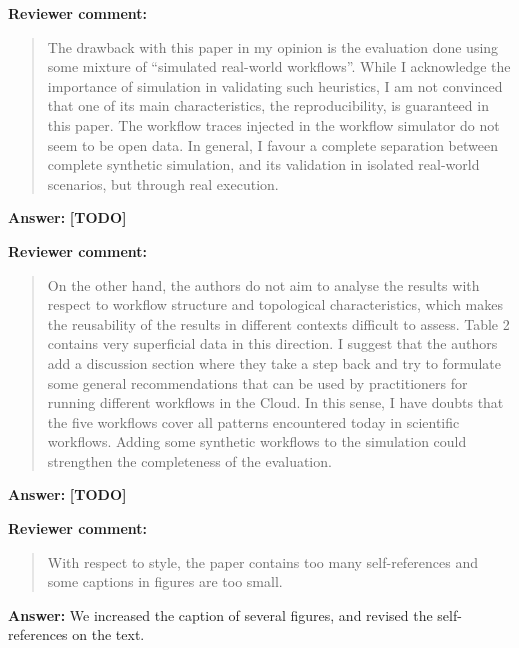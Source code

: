 \documentclass{letter}
\newenvironment{review}%
{\textbf{Reviewer comment:}\begin{quote}}%
{\end{quote}}%
\newcommand{\todo}[1]{%
      \color{red}\textbf{[TODO]} #1\color{black}}
\newcommand{\answer}[1]{%
      \textbf{Answer:} #1}
\begin{document}
\begin{letter}{}
\begin{review}
The drawback with this paper in my opinion is the evaluation done using some mixture of ``simulated real-world workflows''. While I acknowledge the importance of simulation in validating such heuristics, I am not convinced that one of its main characteristics, the reproducibility, is guaranteed in this paper. The workflow traces injected in the workflow simulator do not seem to be open data. In general, I favour a complete separation between complete synthetic simulation, and its validation in isolated real-world scenarios, but through real execution. 
\end{review}

\answer{\todo{}}



\begin{review}
On the other hand, the authors do not aim to analyse the results with respect to workflow structure and topological characteristics, which makes the reusability of the results in different contexts difficult to assess. Table 2 contains very superficial data in this direction. I suggest that the authors add a discussion section where they take a step back and try to formulate some general recommendations that can be used by practitioners for running different workflows in the Cloud. In this sense, I have doubts that the five workflows cover all patterns encountered today in scientific workflows. Adding some synthetic workflows to the simulation could strengthen the completeness of the evaluation.
\end{review}

\answer{\todo{}}



\begin{review}
With respect to style, the paper contains too many self-references and some captions in figures are too small.
\end{review}

\answer{We increased the caption of several figures, and revised the self-references on the text.}



\end{letter}
\end{document}
